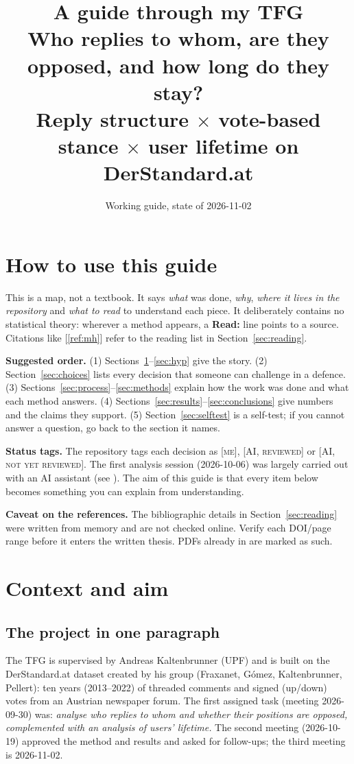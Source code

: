 \documentclass[11pt,a4paper]{article}
\title{\textbf{A guide through my TFG}\\[2pt]\large Who replies to whom, are they opposed, and how long do they stay?\\ Reply structure $\times$ vote-based stance $\times$ user lifetime on DerStandard.at}
\author{Working guide, state of 2026-11-02}
\date{}
\newcommand{\file}[1]{\path{#1}}
\newcommand{\readref}[1]{\textcolor{blue!50!black}{\textbf{Read:}} #1}
\newcommand{\status}[1]{\textsc{\small #1}}
\begin{document}
\maketitle
\tableofcontents

\section*{How to use this guide}
This is a map, not a textbook. It says \emph{what} was done, \emph{why}, \emph{where it lives in the repository} and \emph{what to read} to understand each piece. It deliberately contains no statistical theory: wherever a method appears, a \readref{} line points to a source. Citations like [\ref{ref:mh}] refer to the reading list in Section~\ref{sec:reading}.

\textbf{Suggested order.} (1) Sections~\ref{sec:context}--\ref{sec:hyp} give the story. (2) Section~\ref{sec:choices} lists every decision that someone can challenge in a defence. (3) Sections~\ref{sec:process}--\ref{sec:methods} explain how the work was done and what each method answers. (4) Sections~\ref{sec:results}--\ref{sec:conclusions} give numbers and the claims they support. (5) Section~\ref{sec:selftest} is a self-test; if you cannot answer a question, go back to the section it names.

\textbf{Status tags.} The repository tags each decision as \status{[me]}, \status{[AI, reviewed]} or \status{[AI, not yet reviewed]}. The first analysis session (2026-10-06) was largely carried out with an AI assistant (see \file{notes/method/AI-USE.md}). The aim of this guide is that every item below becomes something you can explain from understanding.

\textbf{Caveat on the references.} The bibliographic details in Section~\ref{sec:reading} were written from memory and are not checked online. Verify each DOI/page range before it enters the written thesis. PDFs already in \file{notes/papers/} are marked as such.

\section{Context and aim}\label{sec:context}
\subsection{The project in one paragraph}
The TFG is supervised by Andreas Kaltenbrunner (UPF) and is built on the DerStandard.at dataset created by his group (Fraxanet, G\'omez, Kaltenbrunner, Pellert): ten years (2013--2022) of threaded comments and signed (up/down) votes from an Austrian newspaper forum. The first assigned task (meeting 2026-09-30) was: \emph{analyse who replies to whom and whether their positions are opposed, complemented with an analysis of users' lifetime.} The second meeting (2026-10-19) approved the method and results and asked for follow-ups; the third meeting is 2026-11-02.
\end{document}
